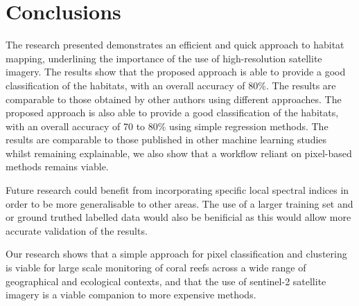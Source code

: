 \documentclass[journal,article,submit,pdftex,moreauthors]{Definitions/mdpi}
\begin{document}
\section{Conclusions}

The research presented demonstrates an efficient and quick approach to habitat mapping, underlining the importance of the use of high-resolution satellite imagery. The results show that the proposed approach is able to provide a good classification of the habitats, with an overall accuracy of 80\%. The results are comparable to those obtained by other authors using different approaches. The proposed approach is also able to provide a good classification of the habitats, with an overall accuracy of 70 to 80\% using simple regression methods. 
The results are comparable to those published in other machine learning studies whilst remaining explainable, we also show that a workflow reliant on pixel-based methods remains viable.

Future research could benefit from incorporating specific local spectral indices in order to be more generalisable to other areas. The use of a larger training set and or ground truthed labelled data would also be benificial as this would allow more accurate validation of the results. 

Our research shows that a simple approach for pixel classification and clustering is viable for large scale monitoring of coral reefs across a wide range of geographical and ecological contexts, and that the use of sentinel-2 satellite imagery is a viable companion to more expensive methods.


\vspace{6pt} 


\end{document}

